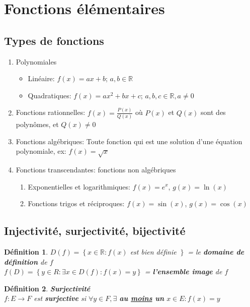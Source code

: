 \documentclass[10pt,a4paper]{book}
\newcommand{\R}{\mathbb{R}}
\newtheorem{definition}{Définition}[section]
\begin{document}
\section{Fonctions élémentaires}

\subsection{Types de fonctions}
\begin{enumerate}
\item Polynomiales
\begin{itemize}
\item Linéaire: $f(x) = ax + b$; $a,b \in \R$
\item Quadratiques: $f(x) = ax^2 + bx + c$; $a,b,c \in \R, a \neq 0$
\end{itemize}
\item Fonctions rationnelles: $f(x) = \frac{P(x)}{Q(x)}$ où $P(x)$ et $Q(x)$ sont des polynômes, et $Q(x) \neq 0$
\item Fonctions algébriques: Toute fonction qui est une solution d'une équation polynomiale, ex: $f(x) = \sqrt{x}$
\item Fonctions transcendantes: fonctions non algébriques
\begin{enumerate}
\item Exponentielles et logarithmiques: $f(x) = e^x$, $g(x) = \ln(x)$
\item Fonctions trigos et réciproques: $f(x) = \sin(x)$, $g(x) = \cos(x)$ 
\end{enumerate}
\end{enumerate}

\subsection{Injectivité, surjectivité, bijectivité}

\begin{definition}
$D(f) = \left\lbrace x \in \R: f(x) \right.$ est bien définie $\left. \right\rbrace$ = le \textbf{domaine de définition} de $f$ \\
$f(D) = \left\lbrace y \in R: \exists x \in D(f): f(x) = y \right\rbrace$ = \textbf{l'ensemble image} de $f$
\end{definition}

\begin{definition} \textbf{Surjectivité}\\
$f: E \rightarrow F$ est \textbf{surjective} si $\forall y \in F, \exists$ \textbf{au \underline{moins} un} $x\in E: f(x) = y$
\end{definition}
\end{document}
